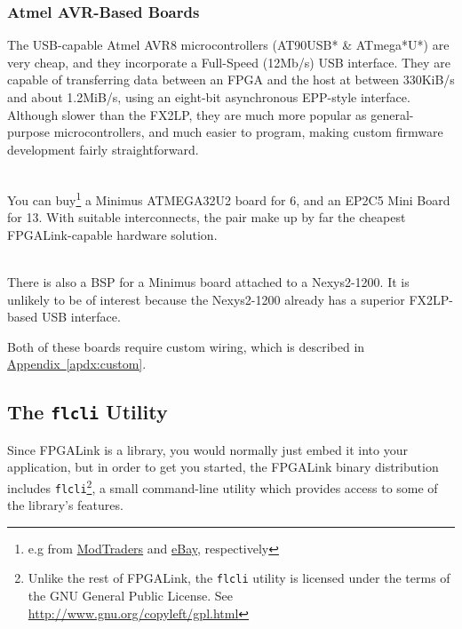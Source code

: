 \subsubsection{Atmel AVR-Based Boards}

The USB-capable Atmel AVR8 microcontrollers (AT90USB* \& ATmega*U*) are very cheap, and they incorporate a Full-Speed (12Mb/s) USB interface. They are capable of transferring data between an FPGA and the host at between 330KiB/s and about 1.2MiB/s, using an eight-bit asynchronous EPP-style interface. Although slower than the FX2LP, they are much more popular as general-purpose microcontrollers, and much easier to program, making custom firmware development fairly straightforward.

\begin{desc}
  \item[\sffamily{Minimus/EP2C5 Board:}] \hfill \\
    You can buy\footnote{e.g from \href{http://www.modtraders.co.uk/minimus-32-avr-usb-development-board.html}{ModTraders} and \href{www.ebay.co.uk/itm/150835820710}{eBay}, respectively} a Minimus ATMEGA32U2 board for \textsterling{}6, and an EP2C5 Mini Board for \textsterling{}13. With suitable interconnects, the pair make up by far the cheapest FPGALink-capable hardware solution.
  \item[\sffamily{Minimus/Nexys2 Board:}] \hfill \\
    There is also a BSP for a Minimus board attached to a Nexys2-1200. It is unlikely to be of interest because the Nexys2-1200 already has a superior FX2LP-based USB interface.
\end{desc}

Both of these boards require custom wiring, which is described in \hyperref[apdx:custom]{Appendix~\ref*{apdx:custom}}.

\newpage
\subsection{The \texttt{flcli} Utility}
Since FPGALink is a library, you would normally just embed it into your application, but in order to get you started, the FPGALink binary distribution includes \texttt{flcli}\footnote{Unlike the rest of FPGALink, the \texttt{flcli} utility is licensed under the terms of the GNU General Public License. See \url{http://www.gnu.org/copyleft/gpl.html}}, a small command-line utility which provides access to some of the library's features.


